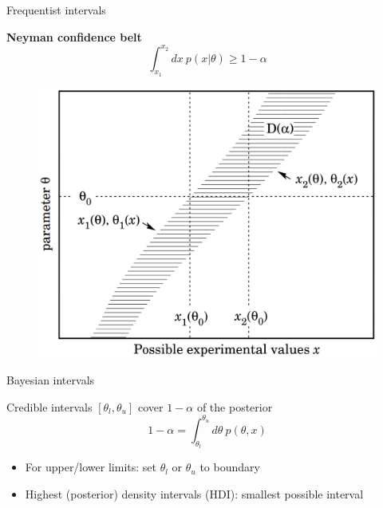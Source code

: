 \documentclass[
aspectratio=169,
14pt,
professionalfonts
]{beamer}
\begin{document}
\begin{frame}{Frequentist intervals}

\begin{minipage}[t]{0.49\linewidth}
\textbf{Neyman confidence belt}
$$
\int_{x_1}^{x_2} dx ~ p(x|\theta) \geq 1-\alpha
$$
\end{minipage}
\begin{minipage}[t]{0.49\linewidth}
\begin{figure}
    \centering
    \includegraphics[width=\linewidth]{../plots/neyman.png}
\end{figure}
\end{minipage}
\end{frame}

\begin{frame}{Bayesian intervals}

Credible intervals $[\theta_l, \theta_u]$ cover $1-\alpha$ of the posterior
$$
1-\alpha = \int_{\theta_l}^{\theta_u} d\theta ~ p(\theta, x)
$$
\begin{itemize}
    \item For upper/lower limits: set $\theta_l$ or $\theta_u$ to boundary
    \item Highest (posterior) density intervals (HDI): smallest possible interval
\end{itemize}
\end{frame}
\end{document}
